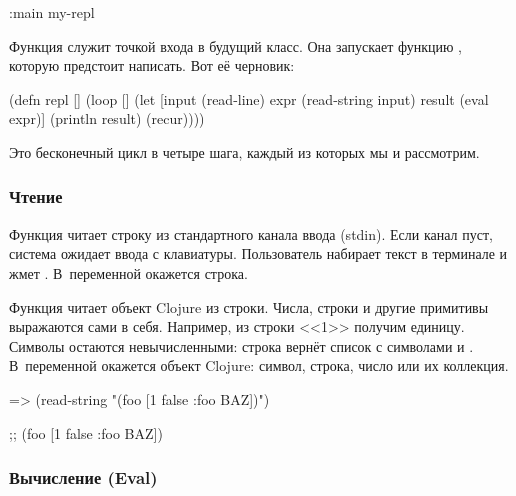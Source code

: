 \begin{english}
  \begin{clojure}
:main my-repl
  \end{clojure}
\end{english}

Функция  служит точкой входа в будущий класс. Она запускает функцию , которую предстоит написать. Вот её черновик:

\begin{english}
  \begin{clojure}
(defn repl []
  (loop []
    (let [input (read-line)
          expr (read-string input)
          result (eval expr)]
      (println result)
      (recur))))
  \end{clojure}
\end{english}

Это бесконечный цикл в четыре шага, каждый из которых мы и рассмотрим.

\subsubsection{Чтение}


Функция  читает строку из стандартного канала ввода (stdin). Если канал пуст, система ожидает ввода с клавиатуры. Пользователь набирает текст в терминале и жмет \enter. В~переменной  окажется строка.

Функция  читает объект Clojure из строки. Числа, строки и другие примитивы выражаются сами в себя. Например, из строки <<1>> получим единицу. Символы остаются невычисленными: строка  вернёт список с символами  и . В~переменной  окажется объект Clojure: символ, строка, число или их коллекция.

\begin{english}
  \begin{clojure}
=> (read-string "(foo [1 false {:foo BAZ}])")

;; (foo [1 false {:foo BAZ}])
  \end{clojure}
\end{english}

\subsubsection{Вычисление (Eval)}


